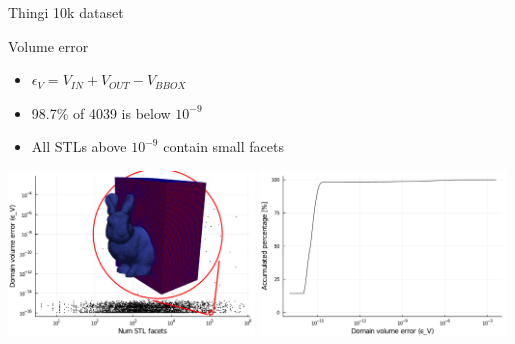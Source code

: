 \documentclass{beamer}
\begin{document}
\begin{frame}{Thingi 10k dataset}

  \begin{block}{Volume error}
  \begin{itemize}
    \item
      $\epsilon_V = V_{IN} + V_{OUT} - V_{BBOX}$
    \item
      98.7\% of 4039 is below $10^{-9}$
    \item
      All STLs above $10^{-9}$ contain small facets
  \end{itemize}
  \end{block}

  \includegraphics[width=0.49\textwidth]{num_stl_facets_volume_error_bunny}
  \includegraphics[width=0.49\textwidth]{../analysis/plots/histogram_volume_error}
\end{frame}
\end{document}
